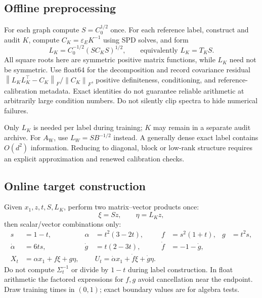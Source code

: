 \documentclass[11pt,letterpaper]{article}
\newcommand{\epsE}{\varepsilon_E}
\newcommand{\norm}[1]{\left\lVert#1\right\rVert}
\newcommand{\AltW}{A_{\mathrm W}}
\begin{document}
\subsection{Offline preprocessing}
For each graph compute $S=C_0^{1/2}$ once. For each reference label, construct and audit $K$, compute $C_K=\epsE K^{-1}$ using SPD solves, and form
\begin{equation}
L_K=C_0^{-1/2}(S C_K S)^{1/2},\qquad\text{equivalently }L_K=T_KS.
\label{eq:offlineL}
\end{equation}
All square roots here are symmetric positive matrix functions, while $L_K$ need not be symmetric. Use float64 for the decomposition and record covariance residual $\norm{L_KL_K^\top-C_K}_F/\norm{C_K}_F$, positive definiteness, conditioning, and reference-calibration metadata. Exact identities do not guarantee reliable arithmetic at arbitrarily large condition numbers. Do not silently clip spectra to hide numerical failures.

Only $L_K$ is needed per label during training; $K$ may remain in a separate audit archive. For $\AltW$, use $L_W=SB^{-1/2}$ instead. A generally dense exact label contains $O(d^2)$ information. Reducing to diagonal, block or low-rank structure requires an explicit approximation and renewed calibration checks.

\subsection{Online target construction}
Given $x_1,z,t,S,L_K$, perform two matrix--vector products once:
\begin{equation}
\xi=Sz,\qquad\eta=L_Kz,
\end{equation}
then scalar/vector combinations only:
\begin{equation}
\boxed{\begin{aligned}
s&=1-t,&\alpha&=t^2(3-2t),& f&=s^2(1+t),&g&=t^2s,\\
\dot\alpha&=6ts,&\dot g&=t(2-3t),&\dot f&=-1-\dot g,\\
X_t&=\alpha x_1+f\xi+g\eta,&&
U_t=\dot\alpha x_1+\dot f\xi+\dot g\eta.
\end{aligned}}
\label{eq:coding}
\end{equation}
Do not compute $\Sigma_t^{-1}$ or divide by $1-t$ during label construction. In float arithmetic the factored expressions for $f,g$ avoid cancellation near the endpoint. Draw training times in $(0,1)$; exact boundary values are for algebra tests.
\end{document}
